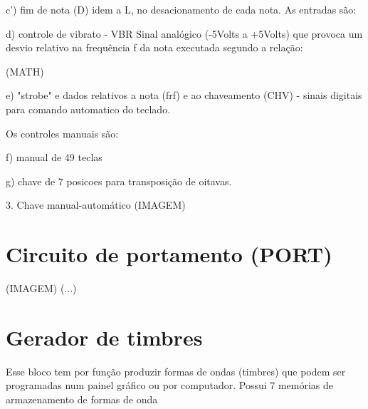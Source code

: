 \documentclass{article}
\begin{document}
c') fim de nota (D) idem a L, no desacionamento de cada nota. As entradas são:

d) controle de vibrato - VBR
Sinal analógico (-5Volts a +5Volts) que provoca um desvio relativo na frequência f da nota executada segundo a relação:

(MATH)

e) "strobe" e dados relativos a nota (frf) e ao chaveamento (CHV) - sinais digitais para comando automatico do teclado.

Os controles manuais são:

f) manual de 49 teclas

g) chave de 7 posicoes para transposição de oitavas.

3. Chave manual-automático
(IMAGEM)

\section{Circuito de portamento (PORT)}
(IMAGEM)
(...) 
\section{Gerador de timbres}

Esse bloco tem por função produzir formas de ondas (timbres) que podem ser programadas num painel gráfico ou por computador. Possui 7 memórias de armazenamento de formas de onda
\end{document}
